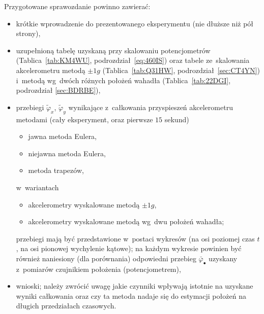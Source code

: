 \documentclass[paper=a4,DIV=12]{lpas}
\begin{document}
Przygotowane sprawozdanie powinno zawierać:
\begin{itemize}
  \item krótkie wprowadzenie do prezentowanego eksperymentu (nie dłuższe niż
    pół strony),
  \item uzupełnioną tabelę uzyskaną przy skalowaniu potencjometrów
    (Tablica~\ref{tab:KM4WU}, podrozdział~\ref{eq:460IS}) oraz tabele
    ze~skalowania akcelerometru metodą $\pm 1g$ (Tablica~\ref{tab:Q31HW},
    podrozdział~\ref{sec:CT4YN}) i~metodą wg~dwóch różnych położeń wahadła
    (Tablica~\ref{tab:22DGI}, podrozdział \ref{sec:BDRBE}),
  \item przebiegi $\tilde{\varphi}_x$, $\tilde{\varphi}_y$ wynikające
    z~całkowania przyspieszeń akcelerometru metodami (cały eksperyment, oraz
    pierwsze $15$ sekund)
    \begin{itemize}
      \item jawna metoda Eulera,
      \item niejawna metoda Eulera,
      \item metoda trapezów,
    \end{itemize}
    w~wariantach
    \begin{itemize}
      \item akcelerometry wyskalowane metodą $\pm 1g$,
      \item akcelerometry wyskalowane metodą wg~dwu położeń wahadła;
    \end{itemize}
    przebiegi mają być przedstawione w~postaci wykresów (na osi poziomej czas
    $t$, na osi pionowej wychylenie kątowe); na każdym wykresie powinien być
    również naniesiony (dla porównania) odpowiedni przebieg
    $\bar{\varphi}_{\bullet}$ uzyskany z~pomiarów czujnikiem położenia
    (potencjometrem),
  \item wnioski; należy zwrócić uwagę jakie czynniki wpływają istotnie na
    uzyskane wyniki całkowania oraz czy ta metoda nadaje się do estymacji
    położeń na długich przedziałach czasowych.
\end{itemize}
\end{document}
